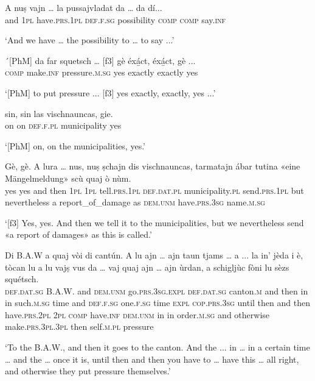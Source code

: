 \begin{linenumbers}
\gll  A nuṣ vajn … la pussajvladat da … da dí...  \\
and \textsc{1pl} have.\textsc{prs.1pl} {} \textsc{def.f.sg} possibility \textsc{comp} {} \textsc{comp} say.\textsc{inf}   \\
\end{linenumbers}
\medskip
\glt `And we have … the possibility to … to say ...'
\medskip

\begin{linenumbers}
\gll ´[PhM] da far squetsch … [f3] gè éxá̱ct, éxá̱ct, gè ...  \\
\textsc{} \textsc{comp} make.\textsc{inf} pressure.\textsc{m.sg} {} \textsc{} yes exactly exactly yes \\
\end{linenumbers}
\medskip
\glt `[PhM] to put pressure ... [f3] yes exactly, exactly, yes ...'
\medskip

\begin{linenumbers}
\gll [PhM] sin, sin las vischnauncas, gie.   \\
\textsc{} on on \textsc{def.f.pl} municipality yes\\
\end{linenumbers}
\medskip
\glt `[PhM] on, on the municipalities, yes.'
\medskip

\begin{linenumbers}
\gll  [f3] Gè, gè. A lura … nus, nuṣ ṣchajn dis vischnauncas, tarmatajn ábar tutina «eine Mängelmeldung»\footnotemark{} scù quaj ò nùm.  \\
\textsc{} yes yes and then {} \textsc{1pl} \textsc{1pl} tell.\textsc{prs.1pl} \textsc{def.dat.pl} municipality.\textsc{pl} send.\textsc{prs.1pl} but nevertheless a report\_of\_damage as \textsc{dem.unm} have.\textsc{prs.3sg} name.\textsc{m.sg}\\
\end{linenumbers}
\medskip
\glt `[f3] Yes, yes. And then we tell it to the municipalities, but we nevertheless send «a report of damages» as this is called.'
\medskip

\begin{linenumbers} 
\gll  Di B.A.W a quaj vòi di cantún. A lu ajn … ajn taun tjams … a ... la in’ jèda i è, tòcan lu a lu vajṣ vus da … vaj quaj ajn … ajn ùrdan, a schigljùc fòni lu sèzs squétsch.\\
\textsc{def.dat.sg} B.A.W. and \textsc{dem.unm} go.\textsc{prs.3sg.expl} \textsc{def.dat.sg} canton.\textsc{m} and then in {} in such.\textsc{m.sg} time {} and {} \textsc{def.f.sg} one.\textsc{f.sg} time \textsc{expl} \textsc{cop.prs.3sg} until then and then have.\textsc{prs.2pl} \textsc{2pl} \textsc{comp} {} have.\textsc{inf} \textsc{dem.unm} in {} in order.\textsc{m.sg} and otherwise make.\textsc{prs.3pl.3pl} then self.\textsc{m.pl} pressure\\
\end{linenumbers}
\medskip
\glt `To the B.A.W., and then it goes to the canton. And the ... in … in a certain time … and the … once it is, until then and then you have to … have this … all right, and otherwise they put pressure themselves.'
\medskip

